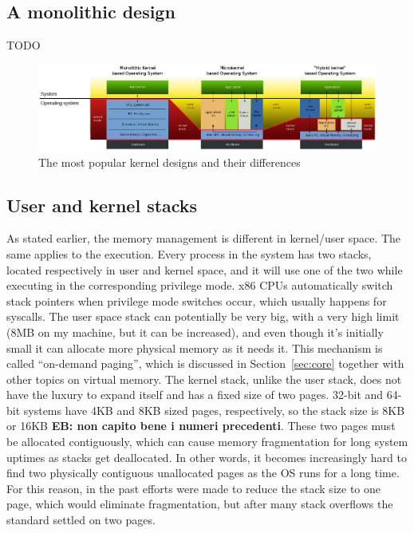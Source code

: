 \documentclass[10pt]{book}
\newcommand{\mycomment}[1]{\textbf{#1}}  %
\begin{document}
\subsection{A monolithic design}
TODO

\begin{figure}[ht]
\includegraphics[width=\textwidth, keepaspectratio]{images/monolithic.png}
\caption{The most popular kernel designs and their differences}
\label{img:monolithic}
\end{figure}

\subsection{User and kernel stacks}
As stated earlier, the memory management is different in kernel/user space.
The same applies to the execution. Every process in the system has two stacks, located respectively in user and kernel space, and it will use one of the two while executing in the corresponding privilege mode. x86 CPUs automatically switch stack pointers when privilege mode switches occur, which usually happens for syscalls. The user space stack can potentially be very big, with a very high limit (8MB on my machine, but it can be increased), and even though it's initially small it can allocate more physical memory as it needs it. This mechanism is called ``on-demand paging'', which is discussed in Section~\ref{sec:core} together with other topics on virtual memory. The kernel stack, unlike the user stack, does not have the luxury to expand itself and has a fixed size of two pages. 32-bit and 64-bit systems have 4KB and 8KB sized pages, respectively, so the stack size is 8KB or 16KB \mycomment{EB: non capito bene i numeri precedenti}. These two pages must be allocated contiguously, which can cause memory fragmentation for long system uptimes as stacks get deallocated. In other words, it becomes increasingly hard to find two physically contiguous unallocated pages as the OS runs for a long time. For this reason, in the past efforts were made to reduce the stack size to one page, which would eliminate fragmentation, but after many stack overflows the standard settled on two pages.
\end{document}

